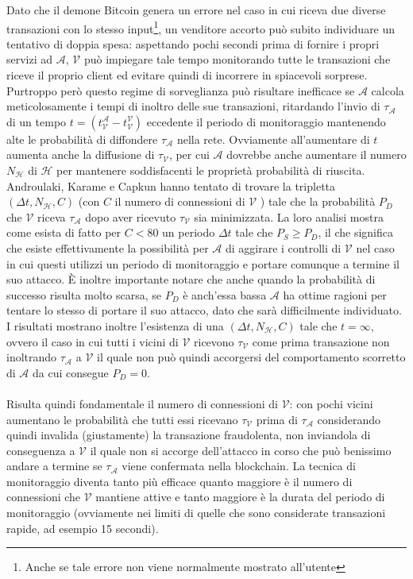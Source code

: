 Dato che il demone Bitcoin genera un errore nel caso in cui riceva due diverse transazioni con lo stesso input\footnote{Anche se tale errore non viene normalmente mostrato all'utente}, un venditore accorto può subito individuare un tentativo di doppia spesa: aspettando pochi secondi prima di fornire i propri servizi ad $\mathcal{A}$, $\mathcal{V}$ può impiegare tale tempo monitorando tutte le transazioni che riceve il proprio client ed evitare quindi di incorrere in spiacevoli sorprese.\\
Purtroppo però questo regime di sorveglianza può risultare inefficace se $\mathcal{A}$ calcola meticolosamente i tempi di inoltro delle sue transazioni, ritardando l'invio di $\tau_\mathcal{A}$ di un tempo $t=\left(t^\mathcal{A}_\mathcal{V} - t^\mathcal{V}_\mathcal{V}\right)$ eccedente il periodo di monitoraggio mantenendo alte le probabilità di diffondere $\tau_\mathcal{A}$ nella rete. Ovviamente all'aumentare di $t$ aumenta anche la diffusione di $\tau_\mathcal{V}$, per cui $\mathcal{A}$ dovrebbe anche aumentare il numero $N_\mathcal{H}$ di $\mathcal{H}$ per mantenere soddisfacenti le proprietà probabilità di riuscita. Androulaki, Karame e Capkun hanno tentato di trovare la tripletta $\left( \Delta t, N_\mathcal{H}, C \right)$ (con $C$ il numero di connessioni di $\mathcal{V}$ ) tale che la probabilità $P_D$ che $\mathcal{V}$ riceva $\tau_\mathcal{A}$ dopo aver ricevuto $\tau_\mathcal{V}$ sia minimizzata. La loro analisi mostra come esista di fatto per $C < 80$ un periodo $\Delta t$ tale che $P_S \geq P_D$, il che significa che esiste effettivamente la possibilità per $\mathcal{A}$ di aggirare i controlli di $\mathcal{V}$ nel caso in cui questi utilizzi un periodo di monitoraggio e portare comunque a termine il suo attacco. È inoltre importante notare che anche quando la probabilità di successo risulta molto scarsa, se $P_D$ è anch'essa bassa $\mathcal{A}$ ha ottime ragioni per tentare lo stesso di portare il suo attacco, dato che sarà difficilmente individuato. I risultati mostrano inoltre l'esistenza di una $\left( \Delta t, N_\mathcal{H}, C\right)$ tale che $t = \infty$, ovvero il caso in cui tutti i vicini di $\mathcal{V}$ ricevono $\tau_\mathcal{V}$ come prima transazione non inoltrando $\tau_\mathcal{A}$ a $\mathcal{V}$ il quale non può quindi accorgersi del comportamento scorretto di $\mathcal{A}$ da cui consegue $P_D = 0$.\\\\
Risulta quindi fondamentale il numero di connessioni di $\mathcal{V}$: con pochi vicini aumentano le probabilità che tutti essi ricevano $\tau_\mathcal{V}$ prima di $\tau_\mathcal{A}$ considerando quindi invalida (giustamente) la transazione fraudolenta, non inviandola di conseguenza a $\mathcal{V}$ il quale non si accorge dell'attacco in corso che può benissimo andare a termine se $\tau_\mathcal{A}$ viene confermata nella blockchain. La tecnica di monitoraggio diventa tanto più efficace quanto maggiore è il numero di connessioni che $\mathcal{V}$ mantiene attive e tanto maggiore è la durata del periodo di monitoraggio (ovviamente nei limiti di quelle che sono considerate transazioni rapide, ad esempio 15 secondi).

